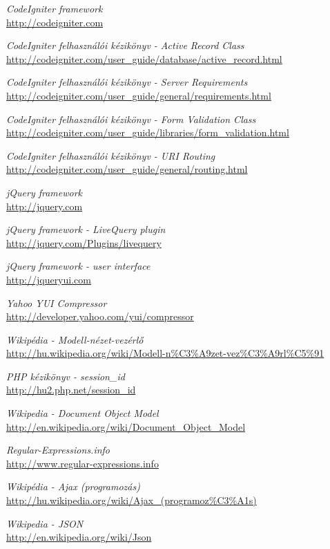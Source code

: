 \documentclass[12pt,a4paper,twoside]{article}
\begin{document}
\begin{thebibliography}{99}

  \emph{CodeIgniter framework}\\
  \url{http://codeigniter.com}

  \emph{CodeIgniter felhasználói kézikönyv - Active Record Class}\\
  \url{http://codeigniter.com/user_guide/database/active_record.html}

  \emph{CodeIgniter felhasználói kézikönyv - Server Requirements}\\
  \url{http://codeigniter.com/user_guide/general/requirements.html}

  \emph{CodeIgniter felhasználói kézikönyv - Form Validation Class}\\
  \url{http://codeigniter.com/user_guide/libraries/form_validation.html}

  \emph{CodeIgniter felhasználói kézikönyv - URI Routing}\\
  \url{http://codeigniter.com/user_guide/general/routing.html}

  \emph{jQuery framework}\\
  \url{http://jquery.com}

  \emph{jQuery framework - LiveQuery plugin}\\
  \url{http://jquery.com/Plugins/livequery}

  \emph{jQuery framework - user interface}\\
  \url{http://jqueryui.com}

  \emph{Yahoo YUI Compressor}\\
  \url{http://developer.yahoo.com/yui/compressor}

  \emph{Wikipédia - Modell-nézet-vezérlő}\\
  \url{http://hu.wikipedia.org/wiki/Modell-n\%C3\%A9zet-vez\%C3\%A9rl\%C5\%91}

  \emph{PHP kézikönyv - session\_id}\\
  \url{http://hu2.php.net/session_id}

  \emph{Wikipedia - Document Object Model}\\
  \url{http://en.wikipedia.org/wiki/Document_Object_Model}

  \emph{Regular-Expressions.info}\\
  \url{http://www.regular-expressions.info}

  \emph{Wikipédia - Ajax (programozás)}\\
  \url{http://hu.wikipedia.org/wiki/Ajax_(programoz\%C3\%A1s)}

  \emph{Wikipedia - JSON}\\
  \url{http://en.wikipedia.org/wiki/Json}

\end{thebibliography}
\end{document}
